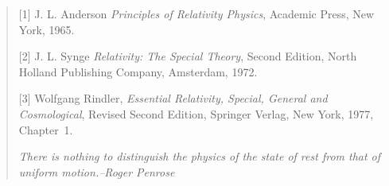 \begin{small}
\begin{quote}

[1] J. L. Anderson \textsl{Principles of Relativity
Physics}, Academic Press, New York, 1965.

[2] J. L. Synge \textsl{Relativity: The Special
Theory},  Second Edition, North Holland Publishing
Company,  Amsterdam, 1972.

[3] Wolfgang  Rindler, \textsl{Essential Relativity,
Special,  General and Cosmological}, Revised Second Edition,
Springer Verlag, New York, 1977, Chapter~1.
\dm\vspace{1\bsk}

\textit{There is nothing to distinguish the physics of the 
state of rest from that of uniform motion.\hfill--Roger 
Penrose}
\end{quote}
\end{small}
